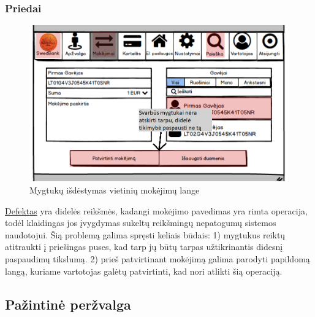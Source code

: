 \documentclass[oneside]{VUMIFPSkursinis}
\begin{document}
\subsubsection{Priedai}
\begin{figure}[H]
	\includegraphics[scale=0.55]{MokejimoPatvirtinimasKlaiduPrevencija.png}
  \caption{Mygtukų išdėstymas vietinių mokėjimų lange}
	\label{fig:klaiduPrevencijaMygtukai}
\end{figure}
\hyperref[lentele:klaiduPrevencijaJ]{Defektas} yra didelės reikšmės, kadangi mokėjimo pavedimas yra rimta operacija, todėl klaidingas jos įvygdymas sukeltų reikšmingų nepatogumų sistemos naudotojui. Šią problemą galima spręsti keliais būdais: 1) mygtukus reiktų atitraukti į priešingas puses, kad tarp jų būtų tarpas užtikrinantis didesnį paspaudimų tikslumą. 2) prieš patvirtinant mokėjimą galima parodyti papildomą langą, kuriame vartotojas galėtų patvirtinti, kad nori atlikti šią operaciją.

\subsection{Pažintinė peržvalga}
\end{document}
